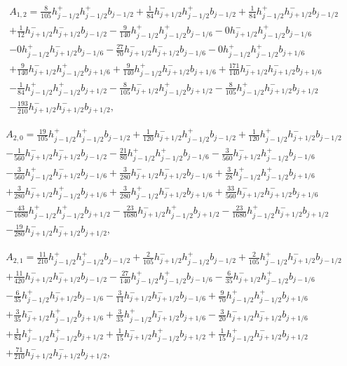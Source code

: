 \documentclass[12pt]{article}
\begin{document}
\begin{multline*} A_{1,2} = \frac{8}{105} h_{j-1/2}^+ h_{j-1/2}^+ b_{j-1/2}+\frac{1}{84} h_{j+1/2}^- h_{j-1/2}^+ b_{j-1/2}+\frac{1}{84} h_{j-1/2}^+ h_{j+1/2}^- b_{j-1/2}\\+\frac{1}{12} h_{j+1/2}^- h_{j+1/2}^- b_{j-1/2}-\frac{9}{140} h_{j-1/2}^+ h_{j-1/2}^+ b_{j-1/6}-0 h_{j+1/2}^- h_{j-1/2}^+ b_{j-1/6}\\-0 h_{j-1/2}^+ h_{j+1/2}^- b_{j-1/6}-\frac{27}{70} h_{j+1/2}^- h_{j+1/2}^- b_{j-1/6}-0 h_{j-1/2}^+ h_{j-1/2}^+ b_{j+1/6}\\+\frac{9}{140} h_{j+1/2}^- h_{j-1/2}^+ b_{j+1/6}+\frac{9}{140} h_{j-1/2}^+ h_{j+1/2}^- b_{j+1/6}+\frac{171}{140} h_{j+1/2}^- h_{j+1/2}^- b_{j+1/6}\\-\frac{1}{84} h_{j-1/2}^+ h_{j-1/2}^+ b_{j+1/2}-\frac{8}{105} h_{j+1/2}^- h_{j-1/2}^+ b_{j+1/2}-\frac{8}{105} h_{j-1/2}^+ h_{j+1/2}^- b_{j+1/2}\\-\frac{193}{210} h_{j+1/2}^- h_{j+1/2}^- b_{j+1/2}, \end{multline*}

\begin{multline*} A_{2,0} = \frac{19}{105} h_{j-1/2}^+ h_{j-1/2}^+ b_{j-1/2}+\frac{1}{120} h_{j+1/2}^- h_{j-1/2}^+ b_{j-1/2}+\frac{1}{120} h_{j-1/2}^+ h_{j+1/2}^- b_{j-1/2}\\-\frac{1}{560} h_{j+1/2}^- h_{j+1/2}^- b_{j-1/2}-\frac{21}{80} h_{j-1/2}^+ h_{j-1/2}^+ b_{j-1/6}-\frac{3}{560} h_{j+1/2}^- h_{j-1/2}^+ b_{j-1/6}\\-\frac{3}{560} h_{j-1/2}^+ h_{j+1/2}^- b_{j-1/6}+\frac{3}{280} h_{j+1/2}^- h_{j+1/2}^- b_{j-1/6}+\frac{3}{28} h_{j-1/2}^+ h_{j-1/2}^+ b_{j+1/6}\\+\frac{3}{280} h_{j+1/2}^- h_{j-1/2}^+ b_{j+1/6}+\frac{3}{280} h_{j-1/2}^+ h_{j+1/2}^- b_{j+1/6}+\frac{33}{560} h_{j+1/2}^- h_{j+1/2}^- b_{j+1/6}\\-\frac{43}{1680} h_{j-1/2}^+ h_{j-1/2}^+ b_{j+1/2}-\frac{23}{1680} h_{j+1/2}^- h_{j-1/2}^+ b_{j+1/2}-\frac{23}{1680} h_{j-1/2}^+ h_{j+1/2}^- b_{j+1/2}\\-\frac{19}{280} h_{j+1/2}^- h_{j+1/2}^- b_{j+1/2}, \end{multline*}

\begin{multline*} A_{2,1} = \frac{11}{210} h_{j-1/2}^+ h_{j-1/2}^+ b_{j-1/2}+\frac{2}{105} h_{j+1/2}^- h_{j-1/2}^+ b_{j-1/2}+\frac{2}{105} h_{j-1/2}^+ h_{j+1/2}^- b_{j-1/2}\\+\frac{11}{420} h_{j+1/2}^- h_{j+1/2}^- b_{j-1/2}-\frac{27}{140} h_{j-1/2}^+ h_{j-1/2}^+ b_{j-1/6}-\frac{6}{35} h_{j+1/2}^- h_{j-1/2}^+ b_{j-1/6}\\-\frac{6}{35} h_{j-1/2}^+ h_{j+1/2}^- b_{j-1/6}-\frac{3}{14} h_{j+1/2}^- h_{j+1/2}^- b_{j-1/6}+\frac{9}{70} h_{j-1/2}^+ h_{j-1/2}^+ b_{j+1/6}\\+\frac{3}{35} h_{j+1/2}^- h_{j-1/2}^+ b_{j+1/6}+\frac{3}{35} h_{j-1/2}^+ h_{j+1/2}^- b_{j+1/6}-\frac{3}{20} h_{j+1/2}^- h_{j+1/2}^- b_{j+1/6}\\+\frac{1}{84} h_{j-1/2}^+ h_{j-1/2}^+ b_{j+1/2}+\frac{1}{15} h_{j+1/2}^- h_{j-1/2}^+ b_{j+1/2}+\frac{1}{15} h_{j-1/2}^+ h_{j+1/2}^- b_{j+1/2}\\+\frac{71}{210} h_{j+1/2}^- h_{j+1/2}^- b_{j+1/2}, \end{multline*}
\end{document}
